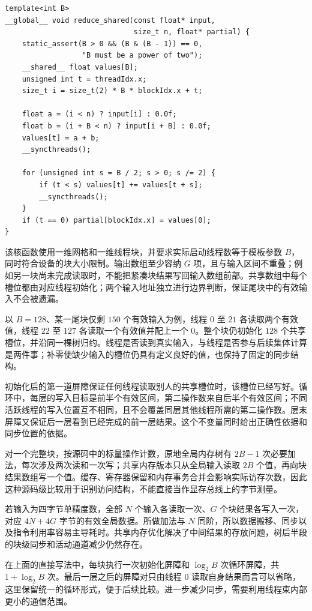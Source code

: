 \noindent\begin{minipage}{\linewidth}
\begin{lstlisting}[caption={带边界检查的共享内存归约：每块输出一个部分和},label={l15:lst:code3}]
template<int B>
__global__ void reduce_shared(const float* input,
                              size_t n, float* partial) {
    static_assert(B > 0 && (B & (B - 1)) == 0,
                  "B must be a power of two");
    __shared__ float values[B];
    unsigned int t = threadIdx.x;
    size_t i = size_t(2) * B * blockIdx.x + t;

    float a = (i < n) ? input[i] : 0.0f;
    float b = (i + B < n) ? input[i + B] : 0.0f;
    values[t] = a + b;
    __syncthreads();

    for (unsigned int s = B / 2; s > 0; s /= 2) {
        if (t < s) values[t] += values[t + s];
        __syncthreads();
    }
    if (t == 0) partial[blockIdx.x] = values[0];
}
\end{lstlisting}
\end{minipage}

该核函数使用一维网格和一维线程块，并要求实际启动线程数等于模板参数 $B$，同时符合设备的块大小限制。输出数组至少容纳 $G$ 项，且与输入区间不重叠；例如另一块尚未完成读取时，不能把紧凑块结果写回输入数组前部。共享数组中每个槽位都由对应线程初始化；两个输入地址独立进行边界判断，保证尾块中的有效输入不会被遗漏。

以 $B=128$、某一尾块仅剩 $150$ 个有效输入为例，线程 $0$ 至 $21$ 各读取两个有效值，线程 $22$ 至 $127$ 各读取一个有效值并配上一个 $0$。整个块仍初始化 $128$ 个共享槽位，并沿同一棵树归约。线程是否读到真实输入，与线程是否参与后续集体计算是两件事；补零使缺少输入的槽位仍具有定义良好的值，也保持了固定的同步结构。

初始化后的第一道屏障保证任何线程读取别人的共享槽位时，该槽位已经写好。循环中，每层的写入目标是前半个有效区间，第二操作数来自后半个有效区间；不同活跃线程的写入位置互不相同，且不会覆盖同层其他线程所需的第二操作数。层末屏障又保证后一层看到已经完成的前一层结果。这个不变量同时给出正确性依据和同步位置的依据。

对一个完整块，按源码中的标量操作计数，原地全局内存树有 $2B-1$ 次必要加法，每次涉及两次读和一次写；共享内存版本只从全局输入读取 $2B$ 个值，再向块结果数组写一个值。缓存、寄存器保留和内存事务合并会影响实际访存次数，因此这种源码级比较用于识别访问结构，不能直接当作显存总线上的字节测量。

若输入为四字节单精度数，全部 $N$ 个输入各读取一次、$G$ 个块结果各写入一次，对应 $4N+4G$ 字节的有效全局数据。所做加法与 $N$ 同阶，所以数据搬移、同步以及指令利用率容易主导耗时。共享内存优化解决了中间结果的存放问题，树后半段的块级同步和活动通道减少仍然存在。

在上面的直接写法中，每块执行一次初始化屏障和 $\log_2B$ 次循环屏障，共 $1+\log_2B$ 次。最后一层之后的屏障对只由线程 $0$ 读取自身结果而言可以省略，这里保留统一的循环形式，便于后续比较。进一步减少同步，需要利用线程束内部更小的通信范围。
